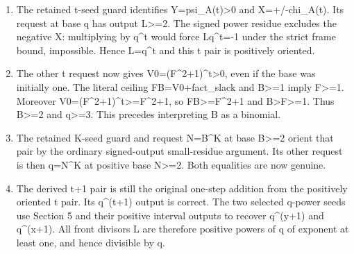 \begin{enumerate}

\item The retained t-seed guard identifies Y=\allowbreak{}psi\_\allowbreak{}A(t)\textgreater{}\allowbreak{}0 and X=\allowbreak{}+\allowbreak{}/\allowbreak{}-chi\_\allowbreak{}A(t). Its request at base q has output L\textgreater{}\allowbreak{}=\allowbreak{}2. The signed power residue excludes the negative X: multiplying by q\textasciicircum{}\allowbreak{}t would force L\textasteriskcentered{}\allowbreak{}q\textasciicircum{}\allowbreak{}t=\allowbreak{}-1 under the strict frame bound, impossible. Hence L=\allowbreak{}q\textasciicircum{}\allowbreak{}t and this t pair is positively oriented.

\item The other t request now gives V0=\allowbreak{}(F\textasciicircum{}\allowbreak{}2+\allowbreak{}1)\textasciicircum{}\allowbreak{}t\textgreater{}\allowbreak{}0, even if the base was initially one. The literal ceiling F\textasteriskcentered{}\allowbreak{}B=\allowbreak{}V0+\allowbreak{}fact\_\allowbreak{}slack and B\textgreater{}\allowbreak{}=\allowbreak{}1 imply F\textgreater{}\allowbreak{}=\allowbreak{}1. Moreover V0=\allowbreak{}(F\textasciicircum{}\allowbreak{}2+\allowbreak{}1)\textasciicircum{}\allowbreak{}t\textgreater{}\allowbreak{}=\allowbreak{}F\textasciicircum{}\allowbreak{}2+\allowbreak{}1, so F\textasteriskcentered{}\allowbreak{}B\textgreater{}\allowbreak{}=\allowbreak{}F\textasciicircum{}\allowbreak{}2+\allowbreak{}1 and B\textgreater{}\allowbreak{}F\textgreater{}\allowbreak{}=\allowbreak{}1. Thus B\textgreater{}\allowbreak{}=\allowbreak{}2 and q\textgreater{}\allowbreak{}=\allowbreak{}3. This precedes interpreting B as a binomial.

\item The retained K-seed guard and request N=\allowbreak{}B\textasciicircum{}\allowbreak{}K at base B\textgreater{}\allowbreak{}=\allowbreak{}2 orient that pair by the ordinary signed-output small-residue argument. Its other request is then q=\allowbreak{}N\textasciicircum{}\allowbreak{}K at positive base N\textgreater{}\allowbreak{}=\allowbreak{}2. Both equalities are now genuine.

\item The derived t+\allowbreak{}1 pair is still the original one-step addition from the positively oriented t pair. Its q\textasciicircum{}\allowbreak{}(t+\allowbreak{}1) output is correct. The two selected q-power seeds use Section 5 and their positive interval outputs to recover q\textasciicircum{}\allowbreak{}(y+\allowbreak{}1) and q\textasciicircum{}\allowbreak{}(x+\allowbreak{}1). All front divisors L are therefore positive powers of q of exponent at least one, and hence divisible by q.


\end{enumerate}
